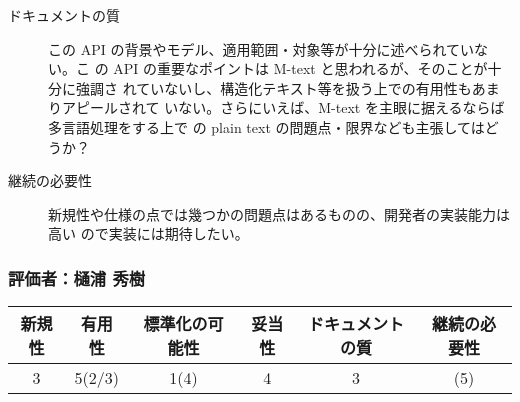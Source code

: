 \begin{description}
\item[ドキュメントの質]

この API の背景やモデル、適用範囲・対象等が十分に述べられていない。こ
の API の重要なポイントは M-text と思われるが、そのことが十分に強調さ
れていないし、構造化テキスト等を扱う上での有用性もあまりアピールされて
いない。さらにいえば、M-text を主眼に据えるならば多言語処理をする上で
の plain text の問題点・限界なども主張してはどうか？

\item[継続の必要性]

新規性や仕様の点では幾つかの問題点はあるものの、開発者の実装能力は高い
ので実装には期待したい。

\end{description}

\subsubsection{評価者：樋浦 秀樹}

\begin{tabular}{|c|c|c|c|c|c|}
\hline
新規性 & 有用性 & 標準化の可能性 & 妥当性 & ドキュメントの質 & 継続の必要性 \\
\hline
3 & 5(2/3) & 1(4) & 4 & 3 & (5)\\
\hline
\end{tabular}

